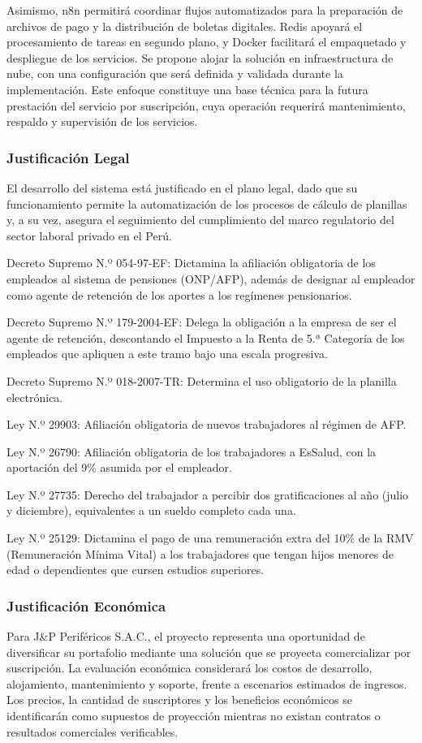 Asimismo, n8n permitirá coordinar flujos automatizados para la preparación de archivos de pago y la distribución de boletas digitales. 
Redis apoyará el procesamiento de tareas en segundo plano, y Docker facilitará el empaquetado y despliegue de los servicios. 
Se propone alojar la solución en infraestructura de nube, con una configuración que será definida y validada durante la implementación. 
Este enfoque constituye una base técnica para la futura prestación del servicio por suscripción, cuya operación requerirá mantenimiento, respaldo y supervisión de los servicios.

\subsubsection{Justificación Legal}
El desarrollo del sistema está justificado en el plano legal, dado que su funcionamiento permite la automatización de los procesos de cálculo de planillas y, a su vez, asegura el seguimiento del cumplimiento del marco regulatorio del sector laboral privado en el Perú.

Decreto Supremo N.º 054-97-EF: Dictamina la afiliación obligatoria de los empleados al sistema de pensiones (ONP/AFP), además de designar al empleador como agente de retención de los aportes a los regímenes pensionarios.

Decreto Supremo N.º 179-2004-EF: Delega la obligación a la empresa de ser el agente de retención, descontando el Impuesto a la Renta de 5.ª Categoría de los empleados que apliquen a este tramo bajo una escala progresiva.

Decreto Supremo N.º 018-2007-TR: Determina el uso obligatorio de la planilla electrónica.

Ley N.º 29903: Afiliación obligatoria de nuevos trabajadores al régimen de AFP.

Ley N.º 26790: Afiliación obligatoria de los trabajadores a EsSalud, con la aportación del 9\% asumida por el empleador.

Ley N.º 27735: Derecho del trabajador a percibir dos gratificaciones al año (julio y diciembre), equivalentes a un sueldo completo cada una.

Ley N.º 25129: Dictamina el pago de una remuneración extra del 10\% de la RMV (Remuneración Mínima Vital) a los trabajadores que tengan hijos menores de edad o dependientes que cursen estudios superiores.

\subsubsection{Justificación Económica}
Para J\&P Periféricos S.A.C., el proyecto representa una oportunidad de diversificar su portafolio mediante una solución que se proyecta comercializar por suscripción. 
La evaluación económica considerará los costos de desarrollo, alojamiento, mantenimiento y soporte, frente a escenarios estimados de ingresos. 
Los precios, la cantidad de suscriptores y los beneficios económicos se identificarán como supuestos de proyección mientras no existan contratos o resultados comerciales verificables.

